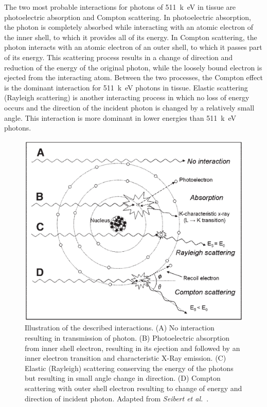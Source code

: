 The two most probable interactions for photons of 511~\si{k\electronvolt} in tissue are photoelectric absorption and Compton scattering. In photoelectric absorption, the photon is completely absorbed while interacting with an atomic electron of the inner shell, to which it provides all of its energy. In Compton scattering, the photon interacts with an atomic electron of an outer shell, to which it passes part of its energy. This scattering process results in a change of direction and reduction of the energy of the original photon, while the loosely bound electron is ejected from the interacting atom. Between the two processes, the Compton effect is the dominant interaction for 511~\si{k\electronvolt} photons in tissue. Elastic scattering (Rayleigh scattering) is another interacting process in which no loss of energy occurs and the direction of the incident photon is changed by a relatively small angle. This interaction is more dominant in lower energies than 511~\si{k\electronvolt} photons.
%
\begin{figure} [ht!]
\centering
\includegraphics[scale=0.45,angle=0]{2_Theory_Methods/figures/Interactions.pdf}
\caption[Illustration of the described interactions. (A) No interaction resulting in transmission of photon. (B) Photoelectric absorption from inner shell electron, resulting in its ejection and followed by an inner electron transition and characteristic X-Ray emission. (C) Elastic (Rayleigh) scattering conserving the energy of the photons but resulting in small angle change in direction. (D) Compton scattering with outer shell electron resulting to change of energy and direction of incident photon.]{Illustration of the described interactions. (A) No interaction resulting in transmission of photon. (B) Photoelectric absorption from inner shell electron, resulting in its ejection and followed by an inner electron transition and characteristic X-Ray emission. (C) Elastic (Rayleigh) scattering conserving the energy of the photons but resulting in small angle change in direction. (D) Compton scattering with outer shell electron resulting to change of energy and direction of incident photon. Adapted from \textit{Seibert et al.}~\cite{Seibert2005}.} 
\label{fig_2:511_interactions}
\end{figure} 
%
